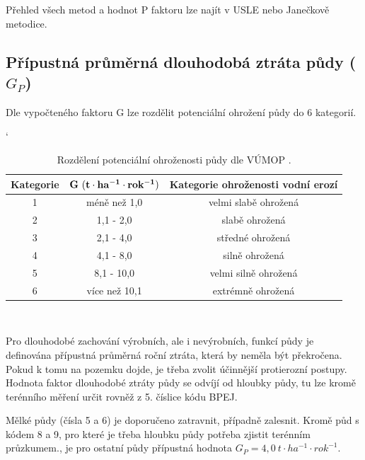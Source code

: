 Přehled všech metod a hodnot P faktoru lze najít v USLE\cite{usle1978} nebo Janečkově metodice\cite{janecek2012}.

\subsection{Přípustná průměrná dlouhodobá ztráta půdy ($G_P$)}
Dle vypočteného faktoru G lze rozdělit potenciální ohrožení půdy do 6 kategorií.\cite{vumop}

\begin{table}[!h]
\begin{center}
\catcode`
    \noindent\begin{tabular}{|*{3}{c|}}
\hline
\bf Kategorie 		& \bf $\bf G~(t\cdot ha^{-1}\cdot rok^{-1})$ & \bf Kategorie ohroženosti vodní erozí\\
\hline
1 & méně než 1,0  & velmi slabě ohrožená\\
   \hline                                   
2 & 1,1 - 2,0  & slabě ohrožená\\
   \hline                        
3 & 2,1 - 4,0 &  středné ohrožená\\
   \hline                              
4 & 4,1 - 8,0 & silně ohrožená\\
   \hline                              
5 & 8,1 - 10,0  &	velmi silně ohrožená\\
   \hline                              
6 & více než 10,1  &	extrémně ohrožená\\
   \hline                                                                                      
    \end{tabular}\\
  \caption[Rozdělení potenciální ohroženosti půdy]{Rozdělení potenciální ohroženosti půdy dle VÚMOP \cite{vumop}.}
  \label{tabulka_ohrozenost}
\end{center}
\end{table}
\FloatBarrier
Pro dlouhodobé zachování výrobních, ale i nevýrobních, funkcí půdy je definována přípustná průměrná roční ztráta, která by neměla být překročena. Pokud k tomu na pozemku dojde, je třeba zvolit účinnější protierozní postupy. Hodnota faktor dlouhodobé ztráty půdy se odvíjí od hloubky půdy, tu lze kromě terénního měření určit rovněž z 5. číslice kódu BPEJ.\cite{janecek2012}

Mělké půdy (čísla 5 a 6) je doporučeno zatravnit, případně zalesnit. Kromě půd s kódem 8 a 9, pro které je třeba hloubku půdy potřeba zjistit terénním průzkumem., je pro ostatní půdy přípustná hodnota $G_P=4,0~t\cdot ha^{-1}\cdot rok^{-1}$.\cite{Novotny2014}
\newpage
